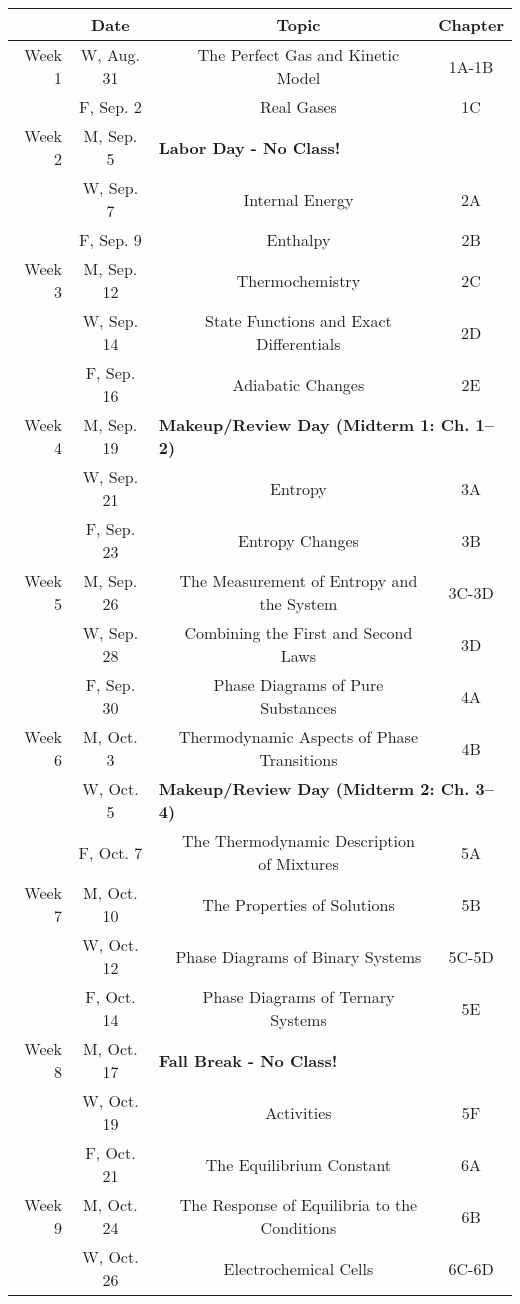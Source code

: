 \begin{tabular}{rcccc}
& Date && Topic & Chapter\\
\midrule
Week 1 & W, Aug. 31&& The Perfect Gas and Kinetic Model & 1A-1B\\
& F, Sep. 2&& Real Gases & 1C\\
\midrule
Week 2 & M, Sep. 5& \multicolumn{3}{l}{\textbf{Labor Day - No Class!}}\\
& W, Sep. 7&& Internal Energy & 2A\\
& F, Sep. 9&& Enthalpy & 2B\\
\midrule
Week 3 & M, Sep. 12&& Thermochemistry & 2C\\
& W, Sep. 14&& State Functions and Exact Differentials & 2D\\
& F, Sep. 16&& Adiabatic Changes & 2E\\
\midrule
Week 4 & M, Sep. 19& \multicolumn{3}{l}{\textbf{Makeup/Review Day (Midterm 1: Ch. 1--2)}}\\
& W, Sep. 21&& Entropy & 3A\\
& F, Sep. 23&& Entropy Changes & 3B\\
\midrule
Week 5 & M, Sep. 26&& The Measurement of Entropy and the System & 3C-3D\\
& W, Sep. 28&& Combining the First and Second Laws & 3D\\
& F, Sep. 30&& Phase Diagrams of Pure Substances & 4A\\
\midrule
Week 6 & M, Oct. 3&& Thermodynamic Aspects of Phase Transitions & 4B\\
& W, Oct. 5& \multicolumn{3}{l}{\textbf{Makeup/Review Day (Midterm 2: Ch. 3--4)}}\\
& F, Oct. 7&& The Thermodynamic Description of Mixtures & 5A\\
\midrule
Week 7 & M, Oct. 10&& The Properties of Solutions & 5B\\
& W, Oct. 12&& Phase Diagrams of Binary Systems & 5C-5D\\
& F, Oct. 14&& Phase Diagrams of Ternary Systems & 5E\\
\midrule
Week 8 & M, Oct. 17& \multicolumn{3}{l}{\textbf{Fall Break - No Class!}}\\
& W, Oct. 19&& Activities & 5F\\
& F, Oct. 21&& The Equilibrium Constant & 6A\\
\midrule
Week 9 & M, Oct. 24&& The Response of Equilibria to the Conditions & 6B\\
& W, Oct. 26&& Electrochemical Cells & 6C-6D\\

\end{tabular}
